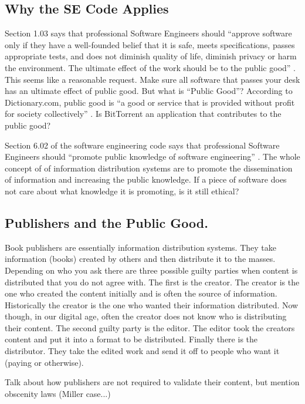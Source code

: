 \documentclass[11pt]{article}
\begin{document}
\subsection{Why the SE Code Applies}

Section 1.03 says that professional Software Engineers should ``approve software only if they have a well-founded belief that it is safe, meets specifications, passes appropriate tests, and does not diminish quality of life, diminish privacy or harm the environment. The ultimate effect of the work should be to the public good'' \cite[1.03]{secode}. This seems like a reasonable request. Make sure all software that passes your desk has an ultimate effect of public good. But what is ``Public Good''? According to Dictionary.com, public good is ``a good or service that is provided without profit for society collectively'' \cite{pubgooddef}. Is BitTorrent an application that contributes to the public good?

Section 6.02 of the software engineering code says that professional Software Engineers should ``promote public knowledge of software engineering'' \cite[6.02]{secode}. The whole concept of of information distribution systems are to promote the dissemination of information and increasing the public knowledge. If a piece of software does not care about what knowledge it is promoting, is it still ethical?

\subsection{Publishers and the Public Good.}

Book publishers are essentially information distribution systems. They take information (books) created by others and then distribute it to the masses. Depending on who you ask there are three possible guilty parties when content is distributed that you do not agree with. The first is the creator. The creator is the one who created the content initially and is often the source of information. Historically the creator is the one who wanted their information distributed. Now though, in our digital age, often the creator does not know who is distributing their content. The second guilty party is the editor. The editor took the creators content and put it into a format to be distributed. Finally there is the distributor. They take the edited work and send it off to people who want it (paying or otherwise).

Talk about how publishers are not required to validate their content, but mention obscenity laws (Miller case...)
\end{document}

